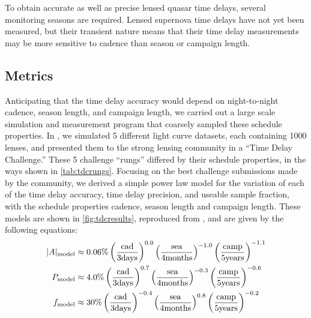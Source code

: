 To obtain accurate as well as precise lensed quasar time delays, several
monitoring seasons are required. Lensed supernova time delays have not
yet been measured, but their transient nature means that their time
delay measurements may be more sensitive to cadence than season or
campaign length.


\subsection{Metrics}
\label{sec:\secname:metrics}

Anticipating that the time delay accuracy would depend on night-to-night
cadence, season length, and campaign length, we carried out a large
scale simulation and measurement program that coarsely sampled these
schedule properties. In \citet{LiaoEtal2015}, we simulated 5 different
light curve datasets, each containing 1000 lenses, and presented them to
the strong lensing community in a ``Time Delay Challenge.'' These 5
challenge ``rungs'' differed by their schedule properties, in the ways
shown in \autoref{tab:tdcrungs}. Focusing on the best challenge
submissions made by the community, we derived a simple power law model
for the variation of each of the time delay accuracy, time delay
precision, and useable sample fraction, with the schedule properties
cadence, season length and campaign length. These models are shown in
\autoref{fig:tdcresults}, reproduced from \citet{LiaoEtal2015}, and are
given by the following equations:
\begin{align}
|A|_{\rm model} &\approx 0.06\% \left(\frac{\rm cad} {\rm 3 days}  \right)^{0.0}
                          \left(\frac{\rm sea}  {\rm 4 months}\right)^{-1.0}
                          \left(\frac{\rm camp}{\rm 5 years} \right)^{-1.1} \notag \\
  P_{\rm model} &\approx 4.0\% \left(\frac{\rm cad} {\rm 3 days}  \right)^{ 0.7}
                         \left(\frac{\rm sea}  {\rm 4 months}\right)^{-0.3}
                         \left(\frac{\rm camp}{\rm 5 years} \right)^{-0.6} \notag \\
  f_{\rm model} &\approx 30\% \left(\frac{\rm cad} {\rm 3 days}  \right)^{-0.4}
                        \left(\frac{\rm sea}  {\rm 4 months}\right)^{ 0.8}
                        \left(\frac{\rm camp}{\rm 5 years} \right)^{-0.2} \notag
\end{align}

